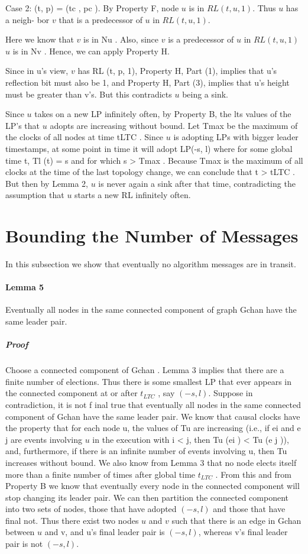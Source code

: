 Case 2: (t, p) = (tc , pc ). By Property F, node $u$ is in $RL (t, u, 1)$. Thus $u$ has a neigh- bor $v$ that is a predecessor of $u$ in $RL (t, u, 1)$.

Here we know that $v$ is in Nu . Also, since $v$ is a predecessor of $u$ in $RL (t, u, 1)$ $u$ is in Nv . Hence, we can apply Property H.

Since in u’s view, $v$ has RL (t, p, 1), Property H, Part (1), implies that u’s reflection bit must also be 1, and Property H, Part (3), implies that u’s height must be greater than v’s. But this contradicts $u$ being a sink.

Since $u$ takes on a new LP infinitely often, by Property B, the lts values of the LP’s that $u$ adopts are increasing without bound. Let Tmax be the maximum of the clocks of all nodes at time tLTC . Since $u$ is adopting LPs with bigger leader timestamps, at some point in time it will adopt LP(-s, l) where for some global time t, Tl (t) = s and for which s > Tmax . Because Tmax is the maximum of all clocks at the time of the last topology change, we can conclude that t > tLTC . But then by Lemma 2, $u$ is never again a sink after that time, contradicting the assumption that $u$ starts a new RL infinitely often.
\section{Bounding the Number of Messages}
In this subsection we show that eventually no algorithm messages are in transit.
\paragraph{Lemma 5} Eventually all nodes in the same connected component of graph Gchan have the same leader pair.
\subparagraph{Proof}Choose a connected component of Gchan . Lemma 3 implies that there are a finite number of elections. Thus there is some smallest LP that ever appears in the connected component at or after $t_{LTC}$ , say $(-s, l)$. Suppose in contradiction, it is not f inal true that eventually all nodes in the same connected component of Gchan have the same leader pair. We know that causal clocks have the property that for each node u, the values of Tu are increasing (i.e., if ei and e j are events involving $u$ in the execution with i < j, then Tu (ei ) < Tu (e j )), and, furthermore, if there is an infinite number of events involving u, then Tu increases without bound. We also know from Lemma 3 that no node elects itself more than a finite number of times after global time $t_{LTC}$ . From this and from Property B we know that eventually every node in the connected component will stop changing its leader pair. We can then partition the connected component into two sets of nodes, those that have adopted $(-s, l)$ and those that have final not. Thus there exist two nodes $u$ and $v$ such that there is an edge in Gchan between $u$ and v, and u’s final leader pair is $(-s, l)$, whereas v’s final leader pair is not $(-s, l)$.


